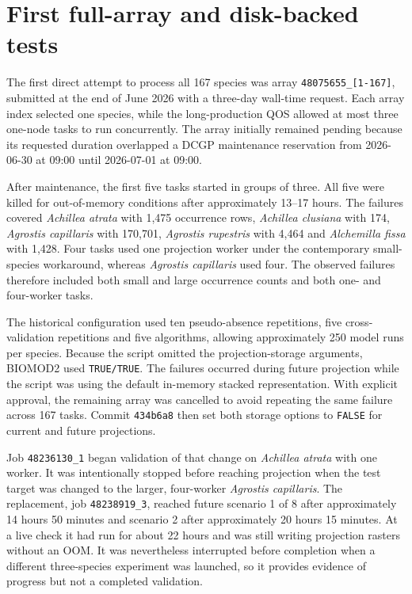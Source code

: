 \section{First full-array and disk-backed tests}

The first direct attempt to process all 167 species was array \texttt{48075655\_[1-167]}, submitted at the end of June 2026 with a three-day wall-time request. Each array index selected one species, while the long-production QOS allowed at most three one-node tasks to run concurrently. The array initially remained pending because its requested duration overlapped a DCGP maintenance reservation from 2026-06-30 at 09:00 until 2026-07-01 at 09:00.

After maintenance, the first five tasks started in groups of three. All five were killed for out-of-memory conditions after approximately 13--17 hours. The failures covered \emph{Achillea atrata} with 1,475 occurrence rows, \emph{Achillea clusiana} with 174, \emph{Agrostis capillaris} with 170,701, \emph{Agrostis rupestris} with 4,464 and \emph{Alchemilla fissa} with 1,428. Four tasks used one projection worker under the contemporary small-species workaround, whereas \emph{Agrostis capillaris} used four. The observed failures therefore included both small and large occurrence counts and both one- and four-worker tasks.

The historical configuration used ten pseudo-absence repetitions, five cross-validation repetitions and five algorithms, allowing approximately 250 model runs per species. Because the script omitted the projection-storage arguments, BIOMOD2 used \texttt{TRUE/TRUE}. The failures occurred during future projection while the script was using the default in-memory stacked representation. With explicit approval, the remaining array was cancelled to avoid repeating the same failure across 167 tasks. Commit \texttt{434b6a8} then set both storage options to \texttt{FALSE} for current and future projections.

Job \texttt{48236130\_1} began validation of that change on \emph{Achillea atrata} with one worker. It was intentionally stopped before reaching projection when the test target was changed to the larger, four-worker \emph{Agrostis capillaris}. The replacement, job \texttt{48238919\_3}, reached future scenario 1 of 8 after approximately 14 hours 50 minutes and scenario 2 after approximately 20 hours 15 minutes. At a live check it had run for about 22 hours and was still writing projection rasters without an OOM. It was nevertheless interrupted before completion when a different three-species experiment was launched, so it provides evidence of progress but not a completed validation.

